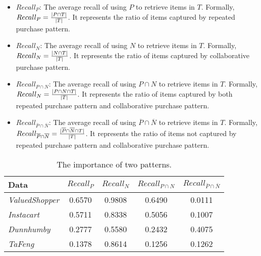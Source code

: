 \documentclass[sigconf]{acmart}
\begin{document}
\begin{itemize}

    \item{$Recall_P$:} The  average recall of using $P$  to retrieve items in $T$.  Formally, $\small Recall_P=\frac{|P\cap T|}{|T|}$. It represents the  ratio of items captured by  repeated purchase pattern.
    \item{$Recall_N$:} The  average recall of using $N$  to retrieve items in $T$.  Formally, $\small Recall_N=\frac{|N\cap T|}{|T|}$. It represents the ratio of items captured by collaborative purchase pattern.
    \item{$Recall_{P\cap N}$:} The  average recall of using $P\cap N$  to retrieve items in $T$.  Formally, $\small Recall_N=\frac{|P\cap N\cap T|}{|T|}$. It represents the ratio of items captured by both repeated purchase pattern and collaborative purchase pattern.
    \item{$Recall_{\overline{P}\cap \overline{N}}$:} The  average recall of using $\overline{P}\cap \overline{N}$ to retrieve items in $T$.  Formally, $\small Recall_{\overline{P}\cap \overline{N}}=\frac{|\overline{P}\cap \overline{N}\cap T|}{|T|}$. It represents the  ratio of items not captured by  repeated purchase pattern and collaborative purchase pattern. 

    
\end{itemize}
   
\begin{table}[ht]
\small
\centering
\caption{The importance of two patterns.}
\begin{tabular}{lcccc}
\toprule
\textbf{Data}&$Recall_P$ &$Recall_N$&$Recall_{P\cap N}$&$Recall_{\overline{P}\cap \overline{N}}$\\
\midrule

\emph{ValuedShopper}&0.6570& 0.9808&0.6490&0.0111 \\

\emph{Instacart}&0.5711 &0.8338& 0.5056&0.1007\\

\emph{Dunnhumby} &0.2777 &0.5580&0.2432&0.4075\\

\emph{TaFeng} &0.1378&0.8614 &0.1256 & 0.1262\\

\bottomrule
\end{tabular}
\label{tab:jaccard}
\end{table}
\end{document}
